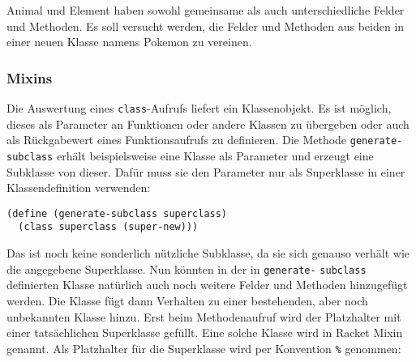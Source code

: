Animal und Element haben sowohl gemeinsame als auch unterschiedliche Felder und Methoden. Es soll versucht werden, die Felder und Methoden aus beiden in einer neuen Klasse namens Pokemon zu vereinen. 



\subsubsection{Mixins}
Die Auswertung eines \texttt{class}-Aufrufs liefert ein Klassenobjekt. Es ist möglich, dieses als Parameter an Funktionen oder andere Klassen zu übergeben oder auch als Rückgabewert eines Funktionsaufrufs zu definieren. Die Methode \texttt{generate-subclass} erhält beispielsweise eine Klasse als Parameter und erzeugt eine Subklasse von dieser. Dafür muss sie den Parameter nur als Superklasse in einer Klassendefinition verwenden:

\begin{lstlisting}
(define (generate-subclass superclass)
  (class superclass (super-new)))
\end{lstlisting} 

Das ist noch keine sonderlich nützliche Subklasse, da sie sich genauso verhält wie die angegebene Superklasse.
% 
% 
% 
% 
% 
Nun könnten in der in \texttt{generate-} \texttt{subclass} definierten Klasse natürlich auch noch weitere Felder und Methoden hinzugefügt werden. Die Klasse fügt dann Verhalten zu einer bestehenden, aber noch unbekannten Klasse hinzu. Erst beim Methodenaufruf wird der Platzhalter mit einer tatsächlichen Superklasse gefüllt. Eine solche Klasse wird in Racket Mixin genannt. Als Platzhalter für die Superklasse wird per Konvention \texttt{\%} genommen:

